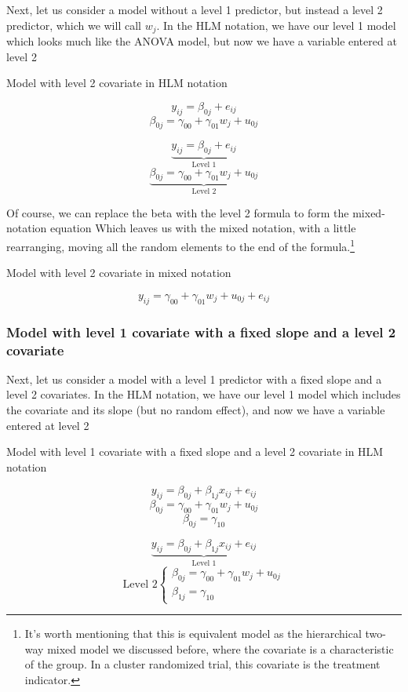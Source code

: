 Next, let us consider a model without a level 1 predictor, but instead a level 2 predictor, which we will call $w_j$. In the HLM notation, we have our level 1 model which looks much like the ANOVA model, but now we have a variable entered at level 2

Model with level 2 covariate in HLM notation

\[
y_{ij} = \beta_{0j}+e_{ij}
\]
\[
\beta_{0j} = \gamma_{00}+\gamma_{01}w_j+u_{0j}
\]

\[
\underbrace{y_{ij} = \beta_{0j}+e_{ij}}_{\text{Level 1}}
\]
\[
\underbrace{\beta_{0j} = \gamma_{00}+\gamma_{01}w_j+u_{0j}}_{\text{Level 2}}
\]

Of course, we can replace the beta with the level 2 formula to form the mixed-notation equation Which leaves us with the mixed notation, with a little rearranging, moving all the random elements to the end of the formula.\footnote{It's worth mentioning that this is equivalent model as the hierarchical two-way mixed model we discussed before, where the covariate is a characteristic of the group. In a cluster randomized trial, this covariate is the treatment indicator.}

Model with level 2 covariate in mixed notation

\[
y_{ij} = \gamma_{00}+\gamma_{01}w_j+u_{0j}+e_{ij}
\]

\subsubsection{Model with level 1 covariate with a fixed slope and a level 2 covariate}

Next, let us consider a model with a level 1 predictor with a fixed slope and a level 2 covariates. In the HLM notation, we have our level 1 model which includes the covariate and its slope (but no random effect), and now we have a variable entered at level 2

Model with level 1 covariate with a fixed slope and a level 2 covariate in HLM notation

\[
y_{ij} = \beta_{0j}+\beta_{1j}x_{ij}+e_{ij}
\]
\[
\beta_{0j} = \gamma_{00}+\gamma_{01}w_j+u_{0j}
\]
\[
\beta_{0j} = \gamma_{10}
\]

\[
\underbrace{y_{ij} = \beta_{0j}+\beta_{1j}x_{ij}+e_{ij}}_{\text{Level 1}}
\]
\[
\mbox{Level 2}
\begin{cases}
    \beta_{0j} = \gamma_{00}+\gamma_{01}w_j+u_{0j}  \\
    \beta_{1j} = \gamma_{10}
\end{cases}
\]


